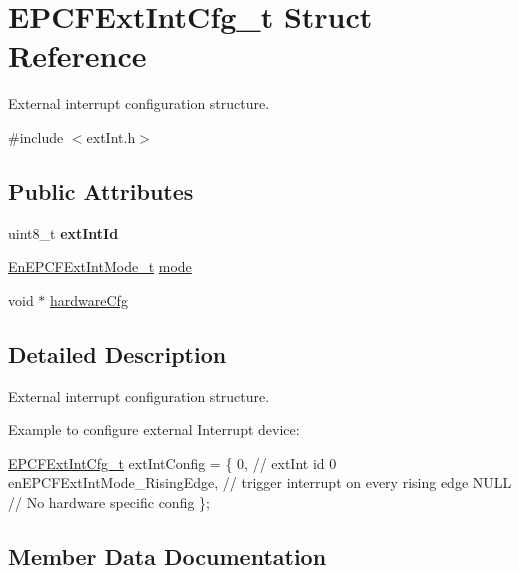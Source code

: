 \hypertarget{structEPCFExtIntCfg__t}{}\section{E\+P\+C\+F\+Ext\+Int\+Cfg\+\_\+t Struct Reference}
\label{structEPCFExtIntCfg__t}


External interrupt configuration structure.  




{\ttfamily \#include $<$ext\+Int.\+h$>$}

\subsection*{Public Attributes}
\begin{DoxyCompactItemize}
\item 
\mbox{\label{structEPCFExtIntCfg__t_a41dfc60867e5caf6f0dd6c88811628eb}} 
uint8\+\_\+t {\bfseries ext\+Int\+Id}
\item 
\mbox{\hyperlink{extInt_8h_ad333fc40b8eb8a629c8ac27ad03b3245}{En\+E\+P\+C\+F\+Ext\+Int\+Mode\+\_\+t}} \mbox{\hyperlink{structEPCFExtIntCfg__t_a0c4178dcdefa4b7386746928b63a586c}{mode}}
\item 
void $\ast$ \mbox{\hyperlink{structEPCFExtIntCfg__t_acbc9a6b2e0864c0a428b33f70ce61d9e}{hardware\+Cfg}}
\end{DoxyCompactItemize}


\subsection{Detailed Description}
External interrupt configuration structure. 

Example to configure external Interrupt device\+:

\mbox{\hyperlink{structEPCFExtIntCfg__t}{E\+P\+C\+F\+Ext\+Int\+Cfg\+\_\+t}} ext\+Int\+Config = \{ 0, // ext\+Int id 0 en\+E\+P\+C\+F\+Ext\+Int\+Mode\+\_\+\+Rising\+Edge, // trigger interrupt on every rising edge N\+U\+LL // No hardware specific config \}; 

\subsection{Member Data Documentation}
\mbox{\label{structEPCFExtIntCfg__t_acbc9a6b2e0864c0a428b33f70ce61d9e}} 
